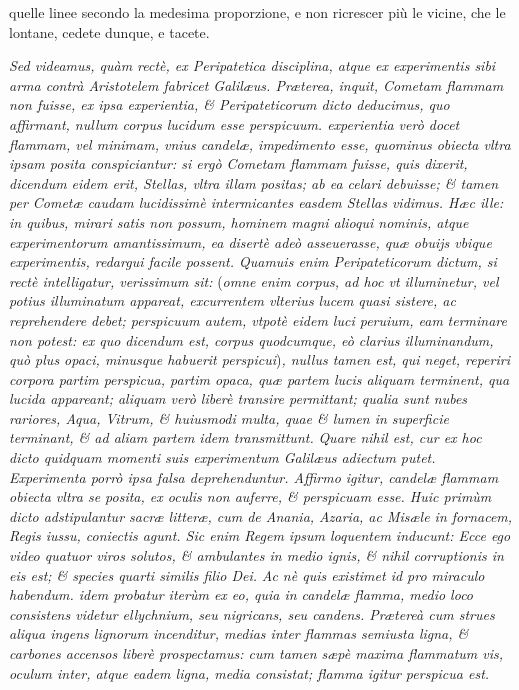 \documentclass[11pt,twoside,openany]{book}
\begin{document}
quelle linee secondo la medesima proporzione, e non ricrescer più le vicine, che le lontane, cedete dunque, e tacete.



\par\bigskip\noindent{}\enspace \textit{Sed videamus, quàm rectè, ex Peripatetica disciplina, atque ex experimentis sibi arma contrà Aristotelem fabricet Galilæus. Præterea, inquit, Cometam flammam non fuisse, ex ipsa experientia, \& Peripateticorum dicto deducimus, quo affirmant, nullum corpus lucidum esse perspicuum. experientia verò docet flammam, vel minimam, vnius candelæ, impedimento esse, quominus obiecta vltra ipsam posita conspiciantur: si ergò Cometam flammam fuisse, quis dixerit, dicendum eidem erit, Stellas, vltra illam positas; ab ea celari debuisse; \& tamen per Cometæ caudam lucidissimè intermicantes easdem Stellas vidimus. Hæc ille: in quibus, mirari satis non possum, hominem magni alioqui nominis, atque experimentorum amantissimum, ea disertè adeò asseuerasse, quæ obuijs vbique experimentis, redargui facile possent. Quamuis enim Peripateticorum dictum, si rectè intelligatur, verissimum sit: }(\textit{omne enim corpus, ad hoc vt illuminetur, vel potius illuminatum appareat, excurrentem vlterius lucem quasi sistere, ac reprehendere debet; perspicuum autem, vtpotè eidem luci peruium, eam }\textit{terminare non potest: ex quo dicendum est, corpus quodcumque, eò clarius illuminandum, quò plus opaci, minusque habuerit perspicui})\textit{, nullus tamen est, qui neget, reperiri corpora partim perspicua, partim opaca, quæ partem lucis aliquam terminent, qua lucida appareant; aliquam verò liberè transire permittant; qualia sunt nubes rariores, Aqua, Vitrum, \& huiusmodi multa, quae \& lumen in superficie terminant, \& ad aliam partem idem transmittunt. }\textit{Quare nihil est, cur ex hoc dicto quidquam momenti suis experimentum Galilæus adiectum putet. }\textit{Experimenta porrò ipsa falsa deprehenduntur. Affirmo igitur, candelæ flammam obiecta vltra se posita, ex oculis non auferre, \& perspicuam esse. Huic primùm dicto adstipulantur sacræ litteræ, cum de Anania, Azaria, ac Misæle in fornacem, Regis iussu, coniectis agunt. Sic enim Regem ipsum loquentem inducunt: Ecce ego video quatuor viros solutos, \& ambulantes in medio ignis, \& nihil corruptionis in eis est; \& species quarti similis filio Dei.}\textit{ }\textit{Ac nè quis existimet id pro miraculo habendum. idem probatur iterùm ex eo, quia in candelæ flamma, medio loco consistens videtur ellychnium, seu nigricans, seu candens. Prætereà cum strues aliqua ingens lignorum incenditur, medias inter flammas semiusta ligna, \& carbones accensos liberè prospectamus: cum tamen sæpè maxima flammatum vis, oculum inter, atque eadem ligna, media consistat; flamma igitur perspicua est.}
\end{document}
